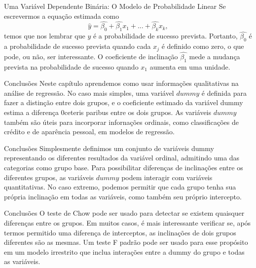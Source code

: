 \documentclass[t,14pt,mathserif]{beamer}
\begin{document}
{
\begin{frame}{Uma Variável Dependente Binária: O Modelo de Probabilidade Linear}
		\justifying 
		\vfill
        Se escrevermos a equação estimada como 
        \begin{equation}
        \hat{y} = \hat{\beta_0} + \hat{\beta_1} x_1 + ... + \hat{\beta_k} x_k , \nonumber
        \end{equation} 
        \vfill 
        temos que nos lembrar que $y$ é a probabilidade de sucesso prevista. Portanto, $\hat{\beta_0}$ é a probabilidade de sucesso prevista quando cada $x_j$ é definido como zero, o que pode, ou não, ser interessante. O coeficiente de inclinação $\hat{\beta_1}$ mede a mudança prevista na probabilidade de sucesso quando $x_1$ aumenta em uma unidade. 

        \end{frame}
}  	



{
\begin{frame}{Conclusões}
		\justifying 
		\vfill
       Neste capítulo aprendemos como usar informações qualitativas na análise de regressão. 
       \vfill
       No caso mais simples, uma variável $dummy$ é definida para fazer a distinção entre dois grupos, e o coeficiente estimado da variável dummy estima a diferença 0ceteris paribus entre os dois grupos. 
        \vfill 
       As variáveis $dummy$ também são úteis para incorporar infornações ordinais, como classificações de crédito e de aparência pessoal, em modelos de regressão. 
       

        \end{frame}
}  	

{
\begin{frame}{Conclusões}
		\justifying 
		\vfill
        Simplesmente definimos um conjunto de variáveis dummy representando os diferentes resultados da variável ordinal, admitindo uma das categorias como grupo base. 
       \vfill
       Para possibilitar diferenças de inclinações entre os diferentes grupos, as variáveis $dummy$ podem interagir com variáveis quantitativas. 
        \vfill 
       No caso extremo, podemos permitir que cada grupo tenha sua própria inclinação em todas as variáveis, como também seu próprio intercepto. 
       

        \end{frame}
}  	

{
\begin{frame}{Conclusões}
		\justifying 
		\vfill
        O teste de Chow pode ser usado para detectar se existem quaisquer diferenças entre os grupos. Em muitos casos, é mais interessante verificar se, após termos permitido uma diferença de interceptos, as inclinações de dois grupos diferentes são as mesmas.
       \vfill
       Um teste F padrão pode ser usado para esse propósito em um modelo irrestrito que inclua interações entre a dummy do grupo e todas as variáveis.
        \vfill 
      
       

        \end{frame}
}  	
\end{document}
